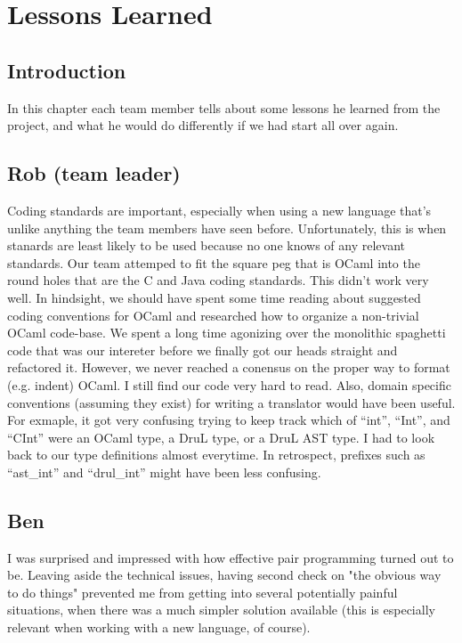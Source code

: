 
\chapter{Lessons Learned}

\section{Introduction}
In this chapter each team member tells about some lessons he learned from
the project, and what he would do differently if we had start all over
again.

\section{Rob (team leader)}

Coding standards are important, especially when using a new language that's unlike anything the team members have seen before.  Unfortunately, this is when stanards are least likely to be used because no one knows of any relevant standards.  Our team attemped to fit the square peg that is OCaml into the round holes that are the C and Java coding standards.  This didn't work very well.  In hindsight, we should have spent some time reading about suggested coding conventions for OCaml and researched how to organize a non-trivial OCaml code-base.  We spent a long time agonizing over the monolithic spaghetti code that was our intereter before we finally got our heads straight and refactored it.  However, we never reached a conensus on the proper way to format (e.g. indent) OCaml.  I still find our code very hard to read.  Also, domain specific conventions (assuming they exist) for writing a translator would have been useful.  For exmaple, it got very confusing trying to keep track which of ``int'', ``Int'', and ``CInt'' were an OCaml type, a DruL type, or a DruL AST type.  I had to look back to our type definitions almost everytime.  In retrospect, prefixes such as ``ast\_int'' and ``drul\_int'' might have been less confusing.

\section{Ben}

I was surprised and impressed with how effective pair programming turned out to be.
Leaving aside the technical issues, having  second check on "the obvious way to do things"
prevented me from getting into several potentially painful situations, when there was a
much simpler solution available (this is especially relevant when working with a new 
language, of course).

